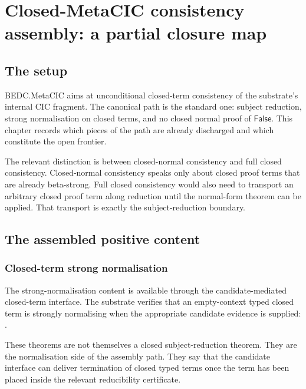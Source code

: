 \chapter{Closed-MetaCIC consistency assembly: a partial closure map}
\label{ch:closed-metacic-consistency-assembly}

\section{The setup}
\label{sec:closed-metacic-consistency-assembly-setup}

BEDC.MetaCIC aims at unconditional closed-term consistency of the substrate's
internal CIC fragment. The canonical path is the standard one: subject
reduction, strong normalisation on closed terms, and no closed normal proof of
$\mathsf{False}$. This chapter records which pieces of the path are already
discharged and which constitute the open frontier.

The relevant distinction is between closed-normal consistency and full closed
consistency. Closed-normal consistency speaks only about closed proof terms that
are already beta-strong. Full closed consistency would also need to transport an
arbitrary closed proof term along reduction until the normal-form theorem can be
applied. That transport is exactly the subject-reduction boundary.

\section{The assembled positive content}
\label{sec:closed-metacic-consistency-assembly-positive-content}

\subsection{Closed-term strong normalisation}
\label{subsec:closed-metacic-consistency-assembly-closed-sn}

The strong-normalisation content is available through the candidate-mediated
closed-term interface. The substrate verifies that an empty-context typed closed
term is strongly normalising when the appropriate candidate evidence is
supplied:
.

These theorems are not themselves a closed subject-reduction theorem. They are
the normalisation side of the assembly path. They say that the candidate
interface can deliver termination of closed typed terms once the term has been
placed inside the relevant reducibility certificate.

